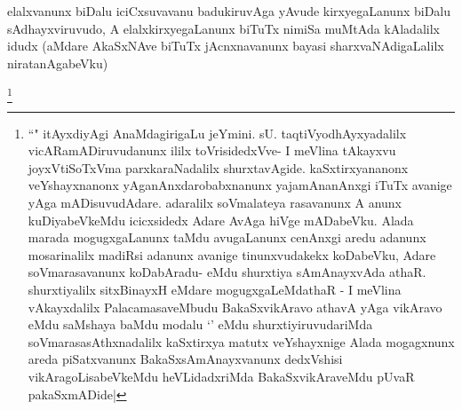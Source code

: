 
\begin{artha}
elalxvanunx biDalu iciCxsuvavanu badukiruvAga yAvude kirxyegaLanunx biDalu sAdhayxviruvudo, A elalxkirxyegaLanunx biTuTx nimiSa muMtAda kAladalilx idudx (aMdare AkaSxNAve biTuTx jAcnxnavanunx bayasi sharxvaNAdigaLalilx niratanAgabeVku)
\end{artha}

\begin{artha}
\footnote{``\stext" itAyxdiyAgi AnaMdagirigaLu jeYmini. sU. taqtiVyodhAyxyadalilx vicARamADiruvudanunx ililx toVrisidedxVve- I meVlina tAkayxvu joyxVtiSoTxVma parxkaraNadalilx shurxtavAgide. kaSxtirxyananonx veYshayxnanonx yAganAnxdarobabxnanunx yajamAnanAnxgi iTuTx avanige yAga mADisuvudAdare. adaralilx soVmalateya rasavanunx A anunx kuDiyabeVkeMdu icicxsidedx Adare AvAga hiVge mADabeVku. Alada marada mogugxgaLanunx taMdu avugaLanunx cenAnxgi aredu adanunx mosarinalilx madiRsi adanunx avanige tinunxvudakekx koDabeVku, Adare soVmarasavanunx koDabAradu- eMdu shurxtiya sAmAnayxvAda athaR. shurxtiyalilx sitxBinayxH eMdare mogugxgaLeMdathaR - I meVlina vAkayxdalilx PalacamasaveMbudu BakaSxvikAravo athavA yAga vikAravo eMdu saMshaya baMdu modalu `\stext' eMdu shurxtiyiruvudariMda soVmarasasAthxnadalilx kaSxtirxya matutx veYshayxnige Alada mogagxnunx areda piSatxvanunx BakaSxsAmAnayxvanunx dedxVshisi vikAragoLisabeVkeMdu heVLidadxriMda BakaSxvikAraveMdu pUvaR pakaSxmADide|}
\end{artha}


